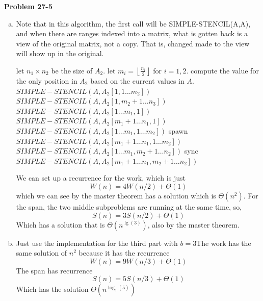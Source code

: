 \documentclass{article}
\begin{document}
\noindent\textbf{Problem 27-5}\\

\begin{enumerate}[a.]
\item Note that in this algorithm, the first call will be SIMPLE-STENCIL(A,A), and when there are ranges indexed into a matrix, what is gotten back is a view of the original matrix, not a copy. That is, changed made to the view will show up in the original.
\begin{algorithm}
\caption{$SIMPLE-STENCIL(A,A_2)$}
\begin{algorithmic}
\State let $n_1\times n_2$ be the size of $A_2$.
\State let $m_i = \left\lfloor \frac{n_i}{2}\right\rfloor$ for $i=1,2$. 
\State compute the value for the only position in $A_2$ based on the current values in $A$.
\Else
\State $SIMPLE-STENCIL(A, A_2[1,1\ldots m_2])$
\State $SIMPLE-STENCIL(A, A_2[1,m_2+1 \ldots n_3])$
\EndIf
\Else
{}
\State $SIMPLE-STENCIL(A, A_2[1\ldots m_1,1])$
\State $SIMPLE-STENCIL(A, A_2[m_1+1 \ldots n_1,1])$
\Else
\State $SIMPLE-STENCIL(A, A_2[1\ldots m_1,1\ldots m_2])$
\State spawn $SIMPLE-STENCIL(A, A_2[ m_1+1 \ldots n_1,1\ldots m_2])$
\State  $SIMPLE-STENCIL(A, A_2[1 \ldots m_1,m_2+1 \ldots n_2])$
\State sync
\State  $SIMPLE-STENCIL(A, A_2[ m_1+1 \ldots n_1,m_2+1\ldots n_2])$
\EndIf
\EndIf
\end{algorithmic}
\end{algorithm}
We can set up a recurrence for the work, which is just
\[
W(n) = 4 W(n/2) + \Theta(1)
\]
which we can see by the master theorem has a solution which is $\Theta(n^2)$. For the span, the two middle subproblems are running at the same time, so,
\[
S(n) = 3 S(n/2) +\Theta(1)
\]
Which has a solution that is $\Theta(n^{\lg(3)})$, also by the master theorem.
\item
Just use the implementation for the third part with $b=3$The work has the same solution of $n^2$ because it has the recurrence
\[
W(n) = 9 W(n/3) + \Theta(1)
\]
The span has recurrence
\[
S(n) = 5 S(n/3) + \Theta(1)
\]
Which has the solution $\Theta(n^{\log_3(5)})$


\end{enumerate}
\end{document}
